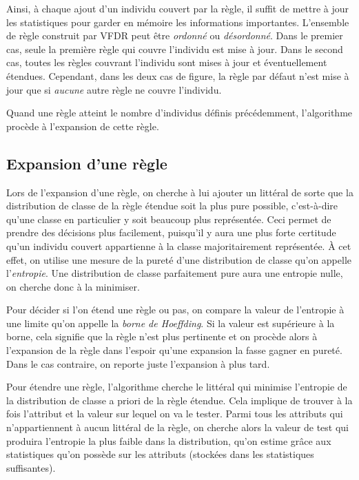             Ainsi, à chaque ajout d’un individu couvert par la règle, il suffit de mettre à jour les statistiques pour garder en mémoire les informations importantes. L’ensemble de règle construit par VFDR peut être \emph{ordonné} ou \emph{désordonné}. Dans le premier cas, seule la première règle qui couvre l’individu est mise à jour. Dans le second cas, toutes les règles couvrant l’individu sont mises à jour et éventuellement étendues. Cependant, dans les deux cas de figure, la règle par défaut n’est mise à jour que si \emph{aucune} autre règle ne couvre l’individu.

            Quand une règle atteint le nombre d’individus définis précédemment, l’algorithme procède à l'expansion de cette règle.

        \subsection{Expansion d'une règle}

            Lors de l’expansion d’une règle, on cherche à lui ajouter un littéral de sorte que la distribution de classe de la règle étendue soit la plus pure possible, c’est-à-dire qu’une classe en particulier y soit beaucoup plus représentée. Ceci permet de prendre des décisions plus facilement, puisqu’il y aura une plus forte certitude qu’un individu couvert appartienne à la classe majoritairement représentée. À cet effet, on utilise une mesure de la pureté d’une distribution de classe qu’on appelle l’\emph{entropie}. Une distribution de classe parfaitement pure aura une entropie nulle, on cherche donc à la minimiser.
            
            Pour décider si l'on étend une règle ou pas, on compare la valeur de l'entropie à une limite qu'on appelle la \emph{borne de Hoeffding}. Si la valeur est supérieure à la borne, cela signifie que la règle n'est plus pertinente et on procède alors à l'expansion de la règle dans l'espoir qu'une expansion la fasse gagner en pureté. Dans le cas contraire, on reporte juste l'expansion à plus tard.

            Pour étendre une règle, l’algorithme cherche le littéral qui minimise l’entropie de la distribution de classe a priori de la règle étendue. Cela implique de trouver à la fois l’attribut et la valeur sur lequel on va le tester. Parmi tous les attributs qui n’appartiennent à aucun littéral de la règle, on cherche alors la valeur de test qui produira l’entropie la plus faible dans la distribution, qu’on estime grâce aux statistiques qu’on possède sur les attributs (stockées dans les statistiques suffisantes).

